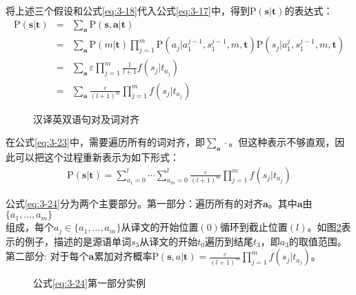 \parinterval 将上述三个假设和公式\ref{eq:3-18}代入公式\ref{eq:3-17}中，得到$\textrm{P}(\mathbf{s}|\mathbf{t})$的表达式：
\begin{eqnarray}
\textrm{P}(\mathbf{s}|\mathbf{t}) & = &  \sum_{\mathbf{a}}{\textrm{P}(\mathbf{s},\mathbf{a}|\mathbf{t})} \nonumber \\
                        & = &  \sum_{\mathbf{a}}{\textrm{P}(m|\mathbf{t})}\prod_{j=1}^{m}{\textrm{P}(a_j|a_1^{j-1},s_1^{j-1},m,\mathbf{t})\textrm{P}(s_j |a_1^j,s_1^{j-1},m,\mathbf{t})} \nonumber \\
                        & = &  \sum_{\mathbf{a}}{\varepsilon}\prod_{j=1}^{m}{\frac{1}{l+1}f(s_j|t_{a_j})} \nonumber \\
                        & = & \sum_{\mathbf{a}}{\frac{\varepsilon}{(l+1)^m}}\prod_{j=1}^{m}f(s_j|t_{a_j})
\label{eq:3-23}
\end{eqnarray}

\begin{figure}[htp]
    \centering

    \caption{汉译英双语句对及词对齐}
    \label{fig:3-18}
\end{figure}

\parinterval 在公式\ref{eq:3-23}中，需要遍历所有的词对齐，即$ \sum_{\mathbf{a}}{\cdot}$。但这种表示不够直观，因此可以把这个过程重新表示为如下形式：
\begin{eqnarray}
\textrm{P}(\mathbf{s}|\mathbf{t})={\sum_{a_1=0}^{l}\cdots}{\sum_{a_m=0}^{l}\frac{\varepsilon}{(l+1)^m}}{\prod_{j=1}^{m}f(s_j|t_{a_j})}
\label{eq:3-24}
\end{eqnarray}

\parinterval 公式\ref{eq:3-24}分为两个主要部分。第一部分：遍历所有的对齐$\mathbf{a}$。其中$\mathbf{a}$由$\{a_1,...,a_m\}$\\ 组成，每个$a_j\in \{a_1,...,a_m\}$从译文的开始位置$(0)$循环到截止位置$(l)$。如图\ref{fig:3-19}表示的例子，描述的是源语单词$s_3$从译文的开始$t_0$遍历到结尾$t_3$，即$a_3$的取值范围。第二部分: 对于每个$\mathbf{a}$累加对齐概率$\textrm{P}(\mathbf{s},a| \mathbf{t})=\frac{\varepsilon}{(l+1)^m}{\prod_{j=1}^{m}f(s_j|t_{a_j})}$。

\begin{figure}[htp]
    \centering

    \caption{公式{\ref{eq:3-24}}第一部分实例}
    \label{fig:3-19}
\end{figure}

